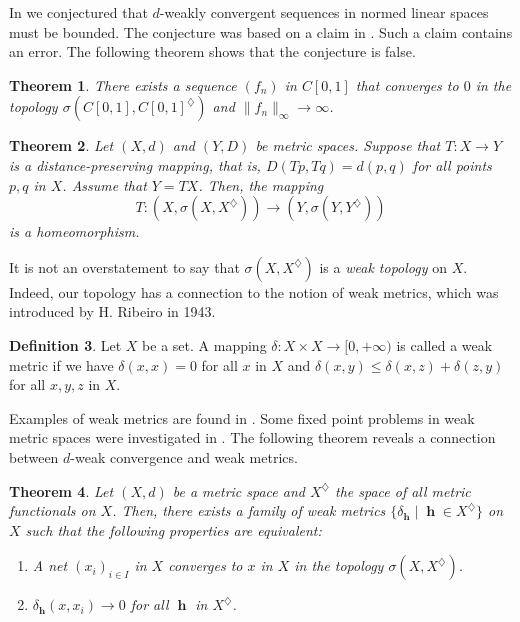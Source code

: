 \documentclass[11pt]{amsart}
\newtheorem{theorem}{Theorem}[section]
\theoremstyle{definition}
\newtheorem{definition}[theorem]{Definition}
\numberwithin{equation}{section}
\DeclareMathOperator{\h}{\mathbf{h}} %
\newcommand{\norm}[1]{\lVert#1\rVert} %
\numberwithin{equation}{section}
\begin{document}
In \cite[Conjecture 1.5]{GNweakconv} we conjectured
that $d$-weakly convergent sequences in normed linear spaces
must be bounded. The conjecture was based
on a claim in \cite[Theorem 1.4]{GNweakconv}. Such a 
claim contains an error. The following theorem shows that
the conjecture is false.

\begin{theorem}\label{thm:conjfalse}
There exists a sequence $(f_n)$ in $C[0,1]$ that
converges to $0$ in the topology 
$\sigma(C[0,1],C[0,1]^\diamondsuit)$ and 
$\norm{f_n}_\infty \to \infty$.
\end{theorem}

\begin{theorem}\label{thm:thm2}
Let $(X,d)$ and $(Y,D)$ be metric spaces. Suppose that
$T:X \to Y$ is a distance-preserving mapping, that is, 
$D(Tp,Tq) = d(p,q)$ for all points $p,q$ in $X$.
Assume that $Y=TX$. Then, the mapping
\[ T: (X, \sigma(X,X^\diamondsuit)) \to (Y, \sigma(Y,Y^\diamondsuit))\]
is a homeomorphism.
\end{theorem}

It is not an overstatement to say that $\sigma(X,X^\diamondsuit)$ 
is a \emph{weak topology} on $X$. Indeed, our topology has a
connection to the notion of weak metrics, which
was introduced by H. Ribeiro \cite{WeakMetric} in 1943. 

\begin{definition}
Let $X$ be a set. A mapping $\delta: X\times X \to [0,+\infty)$
is called a weak metric if we have $\delta(x,x)=0$ for all
$x$ in $X$ and $\delta(x,y)\leq \delta(x,z)+\delta(z,y)$ 
for all $x,y,z$ in $X$.
\end{definition}

Examples of weak metrics are found in \cite{WeakMetED}. 
Some fixed point problems in weak metric spaces 
were investigated in \cite{FixedPWeakM}.
The following theorem reveals a connection between
$d$-weak convergence and weak metrics.

\begin{theorem}\label{thm:thm3}
Let $(X,d)$ be a metric space and $X^\diamondsuit$ the space of 
all metric functionals on $X$. Then, there exists a family of 
weak metrics $\{ \delta_{\h} \mid \h \in X^\diamondsuit \}$ on $X$ 
such that the following properties are equivalent:
\begin{enumerate}
    \item A net $(x_i)_{i\in I}$ in $X$ converges to
    $x$ in $X$ in the topology $\sigma(X,X^\diamondsuit)$.
    \item $\delta_{\h}(x,x_i)\to 0$ for all $\h$ in $X^\diamondsuit$.
\end{enumerate}
\end{theorem}
\end{document}
